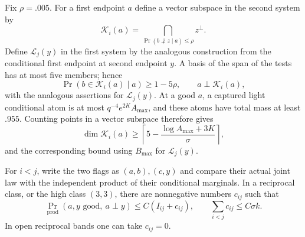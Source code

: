 Fix $\rho=.005$.  For a first endpoint $a$ define a vector subspace in
the second system by
\[
 \mathcal K_i(a)=
 \bigcap_{\Pr(b\not\perp z\mid a)\le\rho} z^\perp.
\]
Define $\mathcal L_j(y)$ in the first system by the analogous construction
from the conditional first endpoint at second endpoint $y$.
A basis of the span of the tests has at most five members; hence
\begin{equation}\label{eq:core-capture}
 \Pr(b\in\mathcal K_i(a)\mid a)\ge1-5\rho,
 \qquad a\perp\mathcal K_i(a),
\end{equation}
with the analogous assertions for $\mathcal L_j(y)$.
At a good $a$, a captured light conditional atom is at most
$q^{-4}e^{2K}A_{\max}$, and these atoms have total mass at least $.955$.
Counting points in a vector subspace therefore gives
\begin{equation}\label{eq:core-dimension}
 \dim\mathcal K_i(a)\ge
 \left\lceil5-\frac{\log A_{\max}+3K}{\sigma}\right\rceil,
\end{equation}
and the corresponding bound using $B_{\max}$ for $\mathcal L_j(y)$.

\begin{lemma}\label{lem:low-conflict}
For $i<j$, write the two flags as $(a,b),(c,y)$ and compare their actual
joint law with the independent product of their conditional marginals.
In a reciprocal class, or the high class $(3,3)$, there are nonnegative
numbers $c_{ij}$ such that
\begin{equation}\label{eq:low-conflict}
 \Pr_{\mathrm{prod}}(a,y\text{ good},\ a\perp y)
 \le C(I_{ij}+c_{ij}),
 \qquad \sum_{i<j}c_{ij}\le C\sigma k.
\end{equation}
In open reciprocal bands one can take $c_{ij}=0$.
\end{lemma}

